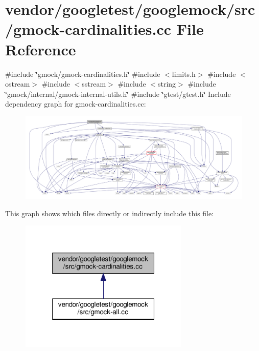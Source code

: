 \hypertarget{gmock-cardinalities_8cc}{}\section{vendor/googletest/googlemock/src/gmock-\/cardinalities.cc File Reference}
\label{gmock-cardinalities_8cc}
{\ttfamily \#include \char`\"{}gmock/gmock-\/cardinalities.\+h\char`\"{}}\newline
{\ttfamily \#include $<$limits.\+h$>$}\newline
{\ttfamily \#include $<$ostream$>$}\newline
{\ttfamily \#include $<$sstream$>$}\newline
{\ttfamily \#include $<$string$>$}\newline
{\ttfamily \#include \char`\"{}gmock/internal/gmock-\/internal-\/utils.\+h\char`\"{}}\newline
{\ttfamily \#include \char`\"{}gtest/gtest.\+h\char`\"{}}\newline
Include dependency graph for gmock-\/cardinalities.cc\+:
\nopagebreak
\begin{figure}[H]
\begin{center}
\leavevmode
\includegraphics[width=350pt]{gmock-cardinalities_8cc__incl}
\end{center}
\end{figure}
This graph shows which files directly or indirectly include this file\+:
\nopagebreak
\begin{figure}[H]
\begin{center}
\leavevmode
\includegraphics[width=229pt]{gmock-cardinalities_8cc__dep__incl}
\end{center}
\end{figure}
